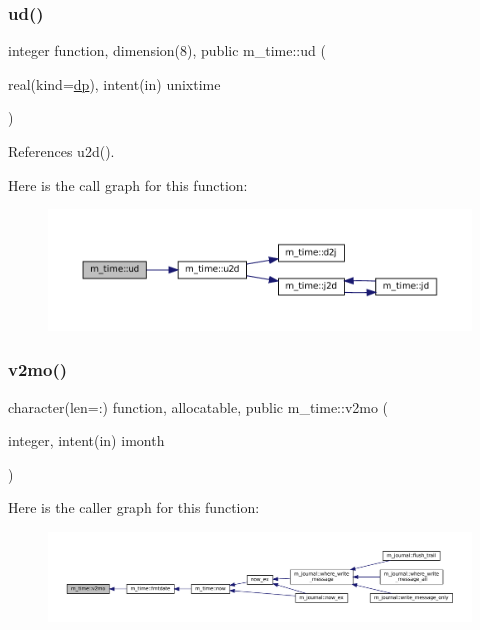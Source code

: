 \subsubsection{\texorpdfstring{ud()}{ud()}}
{\footnotesize\ttfamily integer function, dimension(8), public m\+\_\+time\+::ud (\begin{DoxyParamCaption}\item[{real(kind=\mbox{\hyperlink{namespacem__time_a95f16e7435244d114f0a451625dc189a}{dp}}), intent(in)}]{unixtime }\end{DoxyParamCaption})}



References u2d().

Here is the call graph for this function\+:\nopagebreak
\begin{figure}[H]
\begin{center}
\leavevmode
\includegraphics[width=350pt]{namespacem__time_a8b2c0ede467ef5185d478a072a9f969f_cgraph}
\end{center}
\end{figure}
\mbox{\label{namespacem__time_a6f28cf00e4998bb50bb503f5e4bd3f77}} 
\subsubsection{\texorpdfstring{v2mo()}{v2mo()}}
{\footnotesize\ttfamily character(len=\+:) function, allocatable, public m\+\_\+time\+::v2mo (\begin{DoxyParamCaption}\item[{integer, intent(in)}]{imonth }\end{DoxyParamCaption})}

Here is the caller graph for this function\+:\nopagebreak
\begin{figure}[H]
\begin{center}
\leavevmode
\includegraphics[width=350pt]{namespacem__time_a6f28cf00e4998bb50bb503f5e4bd3f77_icgraph}
\end{center}
\end{figure}
\mbox{\label{namespacem__time_aea9216971a364d79beb307f36e9e3873}} 
